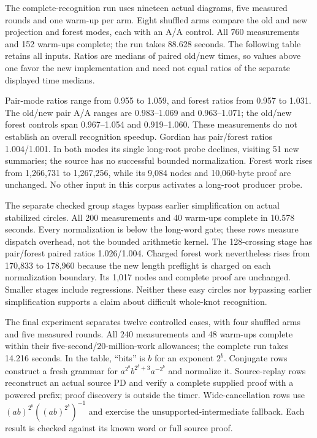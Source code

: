 The complete-recognition run uses nineteen actual diagrams, five measured
rounds and one warm-up per arm. Eight shuffled arms compare the old and
new projection and forest modes, each with an A/A control. All 760
measurements and 152 warm-ups complete; the run takes 88.628 seconds.
The following table retains all inputs. Ratios are medians of paired
old/new times, so values above one favor the new implementation and need
not equal ratios of the separate displayed time medians.



Pair-mode ratios range from 0.955 to 1.059, and forest ratios from 0.957
to 1.031. The old/new pair A/A ranges are 0.983--1.069 and 0.963--1.071;
the old/new forest controls span 0.967--1.054 and 0.919--1.060.
These measurements do not establish an overall recognition speedup.
Gordian has pair/forest ratios 1.004/1.001. In both modes its single
long-root probe declines, visiting 51 new summaries; the source has no
successful bounded normalization. Forest work rises from 1,266,731 to
1,267,256, while its 9,084 nodes and 10,060-byte proof are unchanged.
No other input in this corpus activates a long-root producer probe.



The separate checked group stages bypass earlier simplification on actual
stabilized circles. All 200 measurements and 40 warm-ups complete in
10.578 seconds. Every normalization is below the long-word gate; these
rows measure dispatch overhead, not the bounded arithmetic kernel.
The 128-crossing stage has pair/forest paired ratios 1.026/1.004.
Charged forest work nevertheless rises from 170,833 to 178,960 because
the new length preflight is charged on each normalization boundary.
Its 1,017 nodes and complete proof are unchanged. Smaller stages include
regressions. Neither these easy circles nor bypassing earlier simplification
supports a claim about difficult whole-knot recognition.



The final experiment separates twelve controlled cases, with four shuffled
arms and five measured rounds. All 240 measurements and 48 warm-ups
complete within their five-second/20-million-work allowances; the complete
run takes 14.216 seconds. In the table, ``bits'' is $b$ for an exponent
$2^b$. Conjugate rows construct a fresh grammar for
$a^{2^b}b^{2^b+3}a^{-2^b}$ and normalize it. Source-replay rows reconstruct
an actual source PD and verify a complete supplied proof with a powered
prefix; proof discovery is outside the timer. Wide-cancellation rows use
$(ab)^{2^b}((ab)^{2^b})^{-1}$ and exercise the unsupported-intermediate
fallback. Each result is checked against its known word or full source proof.

